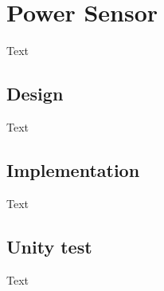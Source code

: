 \section{Power Sensor}
Text

\subsection{Design}
Text

\subsection{Implementation}
Text

\subsection{Unity test}
Text